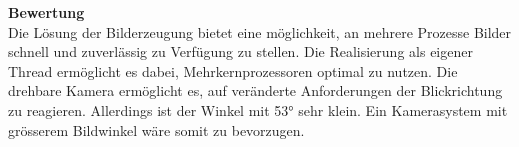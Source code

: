 \textbf{Bewertung}\\[0.2cm]
Die Lösung der Bilderzeugung bietet eine möglichkeit, an mehrere Prozesse Bilder schnell und zuverlässig zu Verfügung zu stellen. Die Realisierung als eigener Thread ermöglicht es dabei, Mehrkernprozessoren optimal zu nutzen. Die drehbare Kamera ermöglicht es, auf veränderte Anforderungen der Blickrichtung zu reagieren. Allerdings ist der Winkel mit 53° sehr klein. Ein Kamerasystem mit grösserem Bildwinkel wäre somit zu bevorzugen.